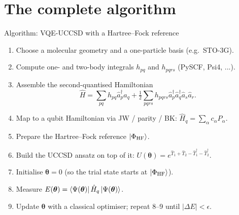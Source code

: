 \documentclass[10pt,aspectratio=169]{beamer}
\begin{document}
\section{The complete algorithm}

\begin{frame}{Algorithm: VQE-UCCSD with a Hartree--Fock reference}
\small
\begin{enumerate}
  \item Choose a molecular geometry and a one-particle basis (e.g.\ STO-3G).
  \item Compute one- and two-body integrals $h_{pq}$ and $h_{pqrs}$ (PySCF, Psi4, ...).
  \item Assemble the second-quantised Hamiltonian
        \[
        \hat H = \sum_{pq} h_{pq}\hat a_p^\dagger \hat a_q + \tfrac12 \sum_{pqrs} h_{pqrs}\hat a_p^\dagger \hat a_q^\dagger \hat a_s \hat a_r.
        \]
  \item Map to a qubit Hamiltonian via JW / parity / BK:
        $\hat H_q = \sum_\alpha c_\alpha P_\alpha$.
  \item Prepare the Hartree--Fock reference $\ket{\Phi_{\mathrm{HF}}}$.
  \item Build the UCCSD ansatz on top of it:
        \(U(\bm\theta) = e^{\hat T_1 + \hat T_2 - \hat T_1^\dagger - \hat T_2^\dagger}.\)
  \item Initialise $\bm\theta = 0$ (so the trial state starts at $\ket{\Phi_{\mathrm{HF}}}$).
  \item Measure $E(\bm\theta) = \bra{\Psi(\bm\theta)}\hat H_q\ket{\Psi(\bm\theta)}$.
  \item Update $\bm\theta$ with a classical optimiser; repeat 8--9 until $|\Delta E| < \epsilon$.
\end{enumerate}
\end{frame}
\end{document}
